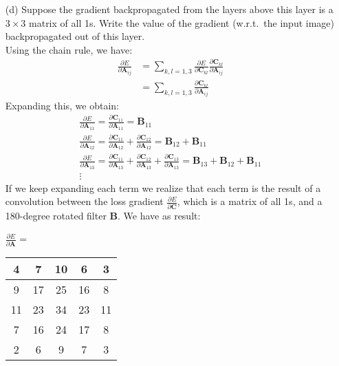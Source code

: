 \documentclass[11pt]{article}
\newcommand{\0}{\mat{0}}
\newcommand{\matr}[1]{\bm{#1}}     %
\begin{document}
\begin{itemize}
    \item[(d)] Suppose the gradient backpropagated from the layers above this layer is a $3\times 3$ matrix of all 1s. Write the value of the gradient (w.r.t.~the input image) backpropagated out of this layer.\\
    
    \smallskip
    Using the chain rule, we have:
   \begin{align*}
    	\frac{\partial E}{ \partial  \matr{A}_{ij}} &= \sum_{k,l=1,3} \frac{\partial E}{\partial \matr{C}_{kl}}   \frac{\partial \matr{C}_{kl}} {\partial  \matr{A}_{ij}} \\
	&= \sum_{k,l=1,3}  \frac{\partial \matr{C}_{kl}} {\partial  \matr{A}_{ij}}
    \end{align*}
    Expanding this, we obtain:
   \begin{gather*}
   	\frac{\partial E}{ \partial  \matr{A}_{11}} = \frac{\partial \matr{C}_{11}} {\partial  \matr{A}_{11}} =   \matr{B}_{11} \\
   	\frac{\partial E}{ \partial  \matr{A}_{12}} = \frac{\partial \matr{C}_{11}} {\partial  \matr{A}_{12}} + \frac{\partial \matr{C}_{12}} {\partial  \matr{A}_{12}} =    \matr{B}_{12} + \matr{B}_{11} \\
	\frac{\partial E}{ \partial  \matr{A}_{13}} = \frac{\partial \matr{C}_{11}} {\partial  \matr{A}_{13}} + \frac{\partial \matr{C}_{12}} {\partial  \matr{A}_{13}} + \frac{\partial \matr{C}_{13}} {\partial  \matr{A}_{13}}  =   \matr{B}_{13} + \matr{B}_{12} + \matr{B}_{11} \\
	\vdots
    \end{gather*}
    If we keep expanding each term we realize that each term is the result of a convolution between the loss gradient $\frac{\partial E}{\partial \matr{C}}$, which is a matrix of all 1s, and a 180-degree rotated filter $\matr{B}$.
    We have as result:
    
    	    \begin{table}[!ht]
		    \centering
    		 $\frac{\partial E}{\partial \matr{A}}$ = \begin{tabular}{|c|c|c|c|c|}  
    			\hline
    			 4  & 7  & 10 &  6 & 3 \\ \hline 
		         9  & 17 & 25 & 16 & 8 \\ \hline
		        11  & 23 & 34 & 23 & 11 \\ \hline 
		         7  & 16 & 24 & 17 & 8 \\ \hline
		         2  & 6  &  9 &  7 & 3 \\ \hline
    		\end{tabular}\hspace{1cm}
        	 \end{table}

\end{itemize}
\end{document}
